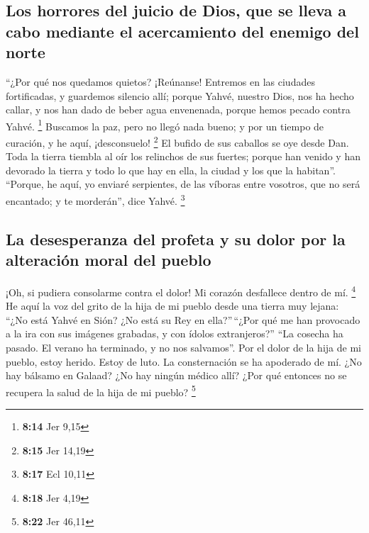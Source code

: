 \begin{paracol}{2}
\hypertarget{los-horrores-del-juicio-de-dios-que-se-lleva-a-cabo-mediante-el-acercamiento-del-enemigo-del-norte}{%
\subsection{Los horrores del juicio de Dios, que se lleva a cabo
mediante el acercamiento del enemigo del
norte}\label{los-horrores-del-juicio-de-dios-que-se-lleva-a-cabo-mediante-el-acercamiento-del-enemigo-del-norte}}

 ``¿Por qué nos quedamos quietos? ¡Reúnanse! Entremos en
las ciudades fortificadas, y guardemos silencio allí; porque Yahvé,
nuestro Dios, nos ha hecho callar, y nos han dado de beber agua
envenenada, porque hemos pecado contra Yahvé. \footnote{\textbf{8:14}
  Jer 9,15}  Buscamos la paz, pero no llegó nada bueno; y
por un tiempo de curación, y he aquí, ¡desconsuelo! \footnote{\textbf{8:15}
  Jer 14,19}  El bufido de sus caballos se oye desde Dan.
Toda la tierra tiembla al oír los relinchos de sus fuertes; porque han
venido y han devorado la tierra y todo lo que hay en ella, la ciudad y
los que la habitan''.  ``Porque, he aquí, yo enviaré
serpientes, de las víboras entre vosotros, que no será encantado; y te
morderán'', dice Yahvé. \footnote{\textbf{8:17} Ecl 10,11}

\hypertarget{la-desesperanza-del-profeta-y-su-dolor-por-la-alteraciuxf3n-moral-del-pueblo}{%
\subsection{La desesperanza del profeta y su dolor por la alteración
moral del
pueblo}\label{la-desesperanza-del-profeta-y-su-dolor-por-la-alteraciuxf3n-moral-del-pueblo}}

 ¡Oh, si pudiera consolarme contra el dolor! Mi corazón
desfallece dentro de mí. \footnote{\textbf{8:18} Jer 4,19}
 He aquí la voz del grito de la hija de mi pueblo desde
una tierra muy lejana: ``¿No está Yahvé en Sión? ¿No está su Rey en
ella?''\,``¿Por qué me han provocado a la ira con sus imágenes grabadas,
y con ídolos extranjeros?''  ``La cosecha ha pasado. El
verano ha terminado, y no nos salvamos''.  Por el dolor
de la hija de mi pueblo, estoy herido. Estoy de luto. La consternación
se ha apoderado de mí.  ¿No hay bálsamo en Galaad? ¿No
hay ningún médico allí? ¿Por qué entonces no se recupera la salud de la
hija de mi pueblo? \footnote{\textbf{8:22} Jer 46,11}


\end{paracol}
